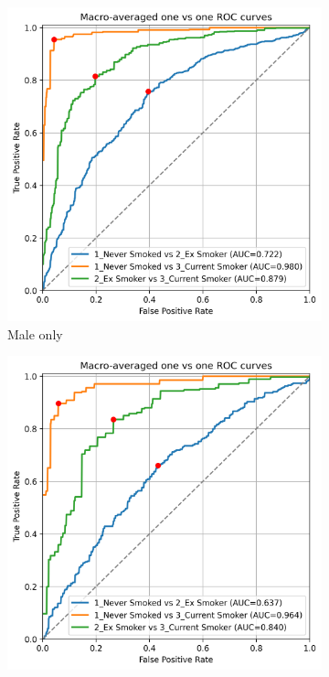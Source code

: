 \documentclass[draft]{article} %
\begin{document}
\begin{figure}[!p]
    \centering
    \begin{subfigure}{0.42\linewidth}
        \centering
        \includegraphics[width=\linewidth]{cohort2/male_only/test_macro_ovo_roc.png}
        \caption{Male only}
    \end{subfigure}
    \hspace{4mm}
    \begin{subfigure}{0.42\linewidth}
        \centering
        \includegraphics[width=\linewidth]{cohort2/female_only/test_macro_ovo_roc.png}

\end{subfigure}
\end{figure}
\end{document}
